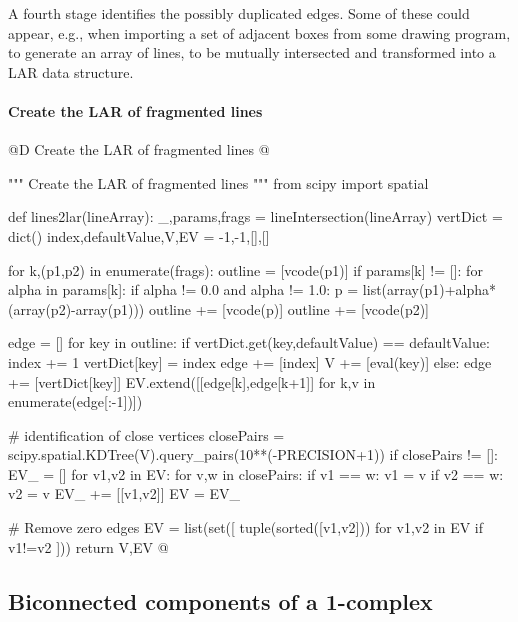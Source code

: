 \documentclass[11pt,oneside]{article}    %
\begin{document}
A fourth stage identifies the possibly duplicated edges. Some of these could appear, e.g., when importing a set of adjacent boxes from some drawing program, to generate an array of lines, to be mutually intersected and transformed into a LAR data structure.

\paragraph{Create the LAR of fragmented lines}
@D Create the LAR of fragmented lines
@{""" Create the LAR of fragmented lines """
from scipy import spatial

def lines2lar(lineArray):
    _,params,frags = lineIntersection(lineArray)
    vertDict = dict()
    index,defaultValue,V,EV = -1,-1,[],[]
    
    for k,(p1,p2) in enumerate(frags):
        outline = [vcode(p1)]
        if params[k] != []:
            for alpha in params[k]:
                if alpha != 0.0 and alpha != 1.0:
                    p = list(array(p1)+alpha*(array(p2)-array(p1)))
                    outline += [vcode(p)]
        outline += [vcode(p2)]
    
        edge = []
        for key in outline:
            if vertDict.get(key,defaultValue) == defaultValue:
                index += 1
                vertDict[key] = index
                edge += [index]
                V += [eval(key)]
            else:
                edge += [vertDict[key]]
            EV.extend([[edge[k],edge[k+1]] for k,v in enumerate(edge[:-1])])
    
    # identification of close vertices
    closePairs = scipy.spatial.KDTree(V).query_pairs(10**(-PRECISION+1))
    if closePairs != []:
        EV_ = []
        for v1,v2 in EV:
            for v,w in closePairs:
                if v1 == w: v1 = v
                if v2 == w: v2 = v
            EV_ += [[v1,v2]]
        EV = EV_

    # Remove zero edges
    EV = list(set([ tuple(sorted([v1,v2])) for v1,v2 in EV if v1!=v2 ]))
    return V,EV
@}

\subsection{Biconnected components of a 1-complex}
\end{document}
